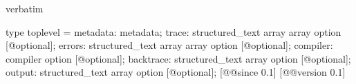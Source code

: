 \begin{camlexample}{verbatim}
\begin{caml}
\begin{camlinput}
type toplevel = {
  metadata: metadata;
  trace: structured_text array array option [@optional];
  errors: structured_text array array option [@optional];
  compiler: compiler option [@optional];
  backtrace: structured_text array option [@optional];
  output: structured_text array option [@optional];
} [@@since 0.1]
[@@version 0.1]
\end{camlinput}
\end{caml}
\end{camlexample}
